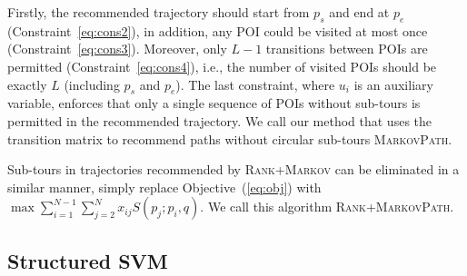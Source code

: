 Firstly, the recommended trajectory should start from $p_s$ and end at $p_e$ (Constraint~\ref{eq:cons2}),
in addition, any POI could be visited at most once (Constraint~\ref{eq:cons3}).
Moreover, only $L-1$ transitions between POIs are permitted (Constraint~\ref{eq:cons4}),
i.e., the number of visited POIs should be exactly $L$ (including $p_s$ and $p_e$).
The last constraint, where $u_i$ is an auxiliary variable, 
enforces that only a single sequence of POIs without sub-tours is permitted in the recommended trajectory.
We call our method that uses the transition matrix to recommend paths 
without circular sub-tours \textsc{MarkovPath}.


Sub-tours in trajectories recommended by \textsc{Rank+Markov} can be eliminated in a similar manner,
simply replace Objective~(\ref{eq:obj}) with $\max \sum_{i=1}^{N-1} \sum_{j=2}^N x_{ij} S(p_j; p_i, q)$.
We call this algorithm \textsc{Rank+MarkovPath}.



\subsection{Structured SVM}
\label{sec:ssvm}
\secmoveup

